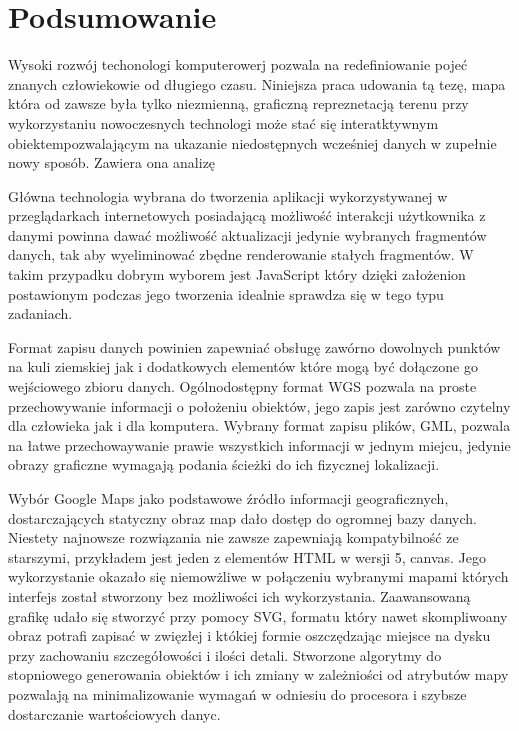 \chapter{Podsumowanie}

Wysoki rozwój techonologi komputerowerj pozwala na redefiniowanie pojeć znanych człowiekowie od długiego czasu. Niniejsza praca udowania tą tezę, mapa która od zawsze była tylko niezmienną, graficzną repreznetacją terenu przy wykorzystaniu nowoczesnych technologi może stać się interatktywnym obiektempozwalającym na ukazanie niedostępnych wcześniej danych w zupełnie nowy sposób. Zawiera ona analizę 

Główna technologia wybrana do tworzenia aplikacji wykorzystywanej w przeglądarkach internetowych posiadającą możliwość interakcji użytkownika z danymi powinna dawać możliwość aktualizacji jedynie wybranych fragmentów danych, tak aby wyeliminować zbędne renderowanie stałych fragmentów. W takim przypadku dobrym wyborem jest JavaScript który dzięki założenion postawionym podczas jego tworzenia idealnie sprawdza się w tego typu zadaniach.

Format zapisu danych powinien zapewniać obsługę zawórno dowolnych punktów na kuli ziemskiej jak i dodatkowych elementów które mogą być dołączone go wejściowego zbioru danych. Ogólnodostępny format WGS pozwala na proste przechowywanie informacji o położeniu obiektów, jego zapis jest zarówno czytelny dla człowieka jak i dla komputera. Wybrany format zapisu plików, GML, pozwala na łatwe przechowaywanie prawie wszystkich informacji w jednym miejcu, jedynie obrazy graficzne wymagają podania ścieżki do ich fizycznej lokalizacji.

Wybór Google Maps jako podstawowe źródło informacji geograficznych, dostarczających statyczny obraz map dało dostęp do ogromnej bazy danych. Niestety najnowsze rozwiązania nie zawsze zapewniają kompatybilność ze starszymi, przykładem jest jeden z elementów HTML w wersji 5, canvas. Jego wykorzystanie okazało się niemowżliwe w połączeniu wybranymi mapami których interfejs został stworzony bez możliwości ich wykorzystania. Zaawansowaną grafikę udało się stworzyć przy pomocy SVG, formatu który nawet skompliwoany obraz potrafi zapisać w zwięzłej i któkiej formie oszczędzając miejsce na dysku przy zachowaniu szczegółowości i ilości detali. Stworzone algorytmy do stopniowego generowania obiektów i ich zmiany w zależniości od atrybutów mapy pozwalają na minimalizowanie wymagań w odniesiu do procesora i szybsze dostarczanie wartościowych danyc.

